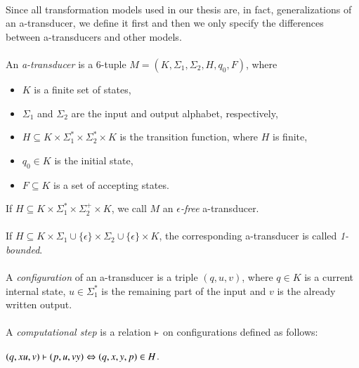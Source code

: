 \paragraph{}
Since all transformation models used in our thesis are, in fact, generalizations of an a-transducer, we define it first and then we only specify the differences between a-transducers and other models.

\paragraph{}
 An \emph{a-transducer} is a 6-tuple $M=(K, \Sigma_{1}, \Sigma_{2}, H, q_{0}, F)$, where
\begin{itemize}
\item $K$ is a finite set of states,
\item $\Sigma_{1} $ and $\Sigma_{2} $ are the input and output alphabet, respectively,
\item $H \subseteq K \times \Sigma_{1}^{*} \times \Sigma_{2}^{*} \times K$ is the transition function, where $H$ is finite,
\item $q_{0} \in K$ is the initial state,
\item $F \subseteq K$ is a set of accepting states.
\end{itemize}
If $H \subseteq K \times \Sigma_{1}^{*} \times \Sigma_{2}^{+} \times K$, we call $M$ an \emph{$\epsilon $-free} a-transducer.

\paragraph{}
 If $H \subseteq K \times \Sigma_{1} \cup \{ \epsilon \} \times \Sigma_{2} \cup \{ \epsilon \} \times K$, the corresponding a-transducer is called \emph{1-bounded}.

\paragraph{}
 A \emph{configuration} of an a-transducer is a triple $(q, u, v)$, where $q \in K$ is a current internal state, $u \in \Sigma_{1}^{*}$ is the remaining part of the input and $v$ is the already written output.

\paragraph{}
 A \emph{computational step} is a relation $\vdash$ on configurations defined as follows: \\
\centerline{$(q, xu, v) \vdash (p, u, vy) \Leftrightarrow (q, x, y, p) \in H$.}

